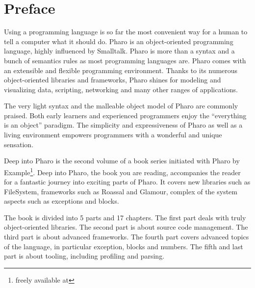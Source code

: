 \documentclass[a4paper,10pt,twoside]{book}
\begin{document}
	\sloppy
	\frontmatter
\fi
\chapter{Preface}

\indent


Using a programming language is so far the most convenient way for a human to tell  a computer what it should do. Pharo is an object-oriented programming language, highly influenced by Smalltalk. Pharo is more than a syntax and a bunch of semantics rules as most programming languages are. Pharo comes with an extensible and flexible programming environment. Thanks to its numerous object-oriented libraries and frameworks, Pharo shines for modeling and visualizing data, scripting, networking and many other ranges of applications.

The very light syntax and the malleable object model of Pharo are commonly praised. Both early learners and experienced programmers enjoy the ``everything is an object'' paradigm. The simplicity and expressiveness of Pharo as well as a living environment empowers programmers with a wonderful and unique sensation. 

Deep into Pharo is the second volume of a book series initiated with Pharo by Example\footnote{freely available at }. 
Deep into Pharo, the book you are reading, accompanies the reader for a fantastic journey into exciting parts of Pharo. It covers new libraries such as FileSystem, frameworks such as Roassal and Glamour, complex of the system aspects such as exceptions and blocks. 

The book is divided into 5 parts and 17 chapters. The first part deals with truly object-oriented libraries. The second part is about source code management. The third part is about advanced frameworks. The fourth part covers advanced topics of the language, in particular exception, blocks and numbers. The fifth and last part is about tooling, including profiling and parsing.
\end{document}
